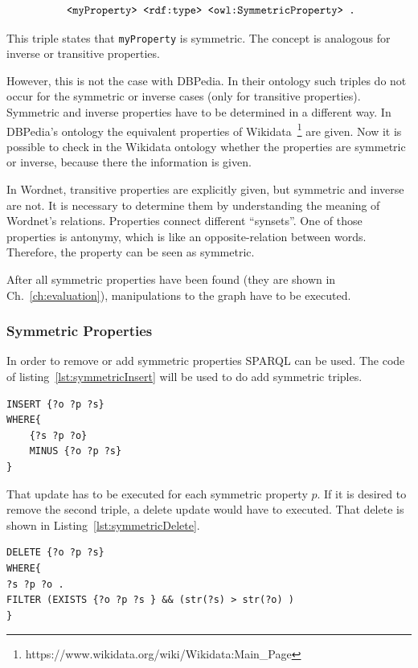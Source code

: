 \[
\text{ {\tt <myProperty> <rdf:type> <owl:SymmetricProperty> .}}
\] 

This triple states that {\tt myProperty} is symmetric. The concept is analogous for inverse or transitive properties. 

However, this is not the case with DBPedia. In their ontology such triples do not occur for the symmetric or inverse cases (only for transitive properties). Symmetric and inverse properties have to be determined in a different way. In DBPedia's ontology the equivalent properties of Wikidata~\footnote{https://www.wikidata.org/wiki/Wikidata:Main\_Page} are given. Now it is possible to check in the Wikidata ontology whether the properties are symmetric or inverse, because there the information is given.

In Wordnet, transitive properties are explicitly given, but symmetric and inverse are not. It is necessary to determine them by understanding the meaning of Wordnet's relations. Properties connect different \enquote{synsets}. One of those properties is antonymy, which is like an opposite-relation between words. Therefore, the property can be seen as symmetric.


After all symmetric properties have been found (they are shown in Ch.~\ref{ch:evaluation}), manipulations to the graph have to be executed.

\subsubsection{Symmetric Properties}

In order to remove or add symmetric properties SPARQL can be used. The code of listing~\ref{lst:symmetricInsert} will be used to do add symmetric triples.

\begin{lstlisting}[captionpos=b, caption=SPARQL update for adding triples with the symmetric property p., label=lst:symmetricInsert,
basicstyle=\ttfamily,frame=single,float=hbt,]
INSERT {?o ?p ?s}
WHERE{
	{?s ?p ?o}
	MINUS {?o ?p ?s}
}
\end{lstlisting}

That update has to be executed for each symmetric property $p$. If it is desired to remove the second triple, a delete update would have to executed. That delete is shown in Listing~\ref{lst:symmetricDelete}.


\begin{lstlisting}[captionpos=b, caption=SPARQL update for removing triples with the symmetric property p., label=lst:symmetricDelete,
basicstyle=\ttfamily,frame=single,float=hbt,]
DELETE {?o ?p ?s}
WHERE{
?s ?p ?o .
FILTER (EXISTS {?o ?p ?s } && (str(?s) > str(?o) )
}
\end{lstlisting}

